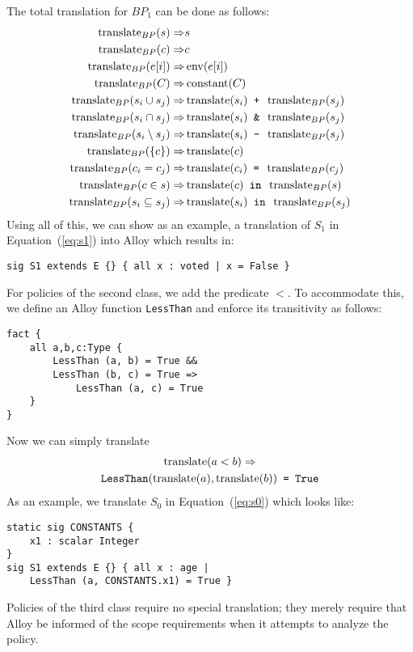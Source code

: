 The total translation for $BP_1$ can be done as follows:
\begin{align}
  \operatorname{translate}_{BP} (s) \Rightarrow & s \nonumber \\
  \operatorname{translate}_{BP} (c) \Rightarrow & c \nonumber \\
  \operatorname{translate}_{BP} (e[i]) \Rightarrow & \operatorname{env} (e[i]) \nonumber \\ 
  \operatorname{translate}_{BP} (C) \Rightarrow & \operatorname{constant} (C) \nonumber \\
  \operatorname{translate}_{BP} (s_i \cup s_j) \Rightarrow & \operatorname{translate}(s_i) \text{\texttt{ + }}
  \operatorname{translate}_{BP} (s_j) \nonumber \\
  \operatorname{translate}_{BP} (s_i \cap s_j) \Rightarrow & \operatorname{translate}(s_i) \text{\texttt{ \& }}
  \operatorname{translate}_{BP} (s_j) \nonumber \\
  \operatorname{translate}_{BP} (s_i \setminus s_j) \Rightarrow & \operatorname{translate}(s_i)
  \text{\texttt{ - }} \operatorname{translate}_{BP} (s_j) \nonumber \\
  \operatorname{translate}_{BP} (\{ c \}) \Rightarrow & \operatorname{translate}(c) \nonumber \\
  \operatorname{translate}_{BP} (c_i = c_j) \Rightarrow & \operatorname{translate}(c_i) \text{\texttt{ = }}
  \operatorname{translate}_{BP} (c_j) \nonumber \\
  \operatorname{translate}_{BP} (c \in s) \Rightarrow & \operatorname{translate}(c) \text{\texttt{ in }}
  \operatorname{translate}_{BP} (s) \nonumber \\
  \operatorname{translate}_{BP} (s_i \subseteq s_j) \Rightarrow & \operatorname{translate}(s_i)
  \text{\texttt{ in }} \operatorname{translate}_{BP} (s_j) \nonumber
\end{align}
Using all of this, we can show as an example, a translation of $S_1$
in Equation~(\ref{eq:s1}) into Alloy which results in:
\begin{verbatim}
sig S1 extends E {} { all x : voted | x = False }
\end{verbatim}
For policies of the second class, we add the predicate $<$.  To
accommodate this, we define an Alloy function \texttt{LessThan} and
enforce its transitivity as follows:
\begin{verbatim}
fact {
    all a,b,c:Type {
        LessThan (a, b) = True && 
        LessThan (b, c) = True => 
            LessThan (a, c) = True
    }
}
\end{verbatim}
Now we can simply translate
\begin{multline*}
  \operatorname{translate}(a < b) \Rightarrow \\
  \text{\texttt{LessThan}} (\operatorname{translate}(a), \operatorname{translate}(b)) \text{\texttt{ = True}}
\end{multline*}
As an example, we translate $S_0$ in Equation~(\ref{eq:s0}) which
looks like:
\begin{verbatim}
static sig CONSTANTS {
    x1 : scalar Integer
}
sig S1 extends E {} { all x : age | 
    LessThan (a, CONSTANTS.x1) = True }
\end{verbatim}
Policies of the third class require no special translation; they
merely require that Alloy be informed of the scope requirements when
it attempts to analyze the policy.

